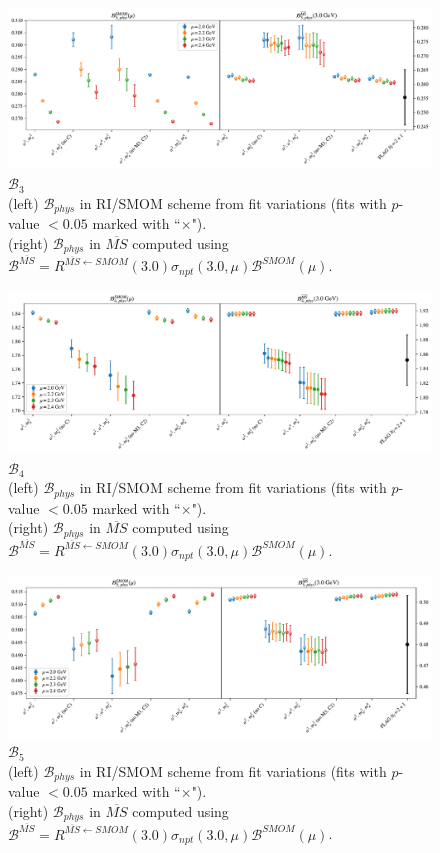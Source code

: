 \documentclass[12pt]{extarticle}
\begin{document}
\begin{figure}
\centering
\includegraphics[page=1, width=1.1\textwidth]{SSmPP/SUSY/fit_summary.pdf}
\caption{$\mathcal{B}_{3}$\\(left) $\mathcal{B}_{phys}$ in RI/SMOM scheme from fit variations (fits with $p$-value $<0.05$ marked with ``$\times$"). \\(right) $\mathcal{B}_{phys}$ in $\overline{MS}$ computed using $\mathcal{B}^{\overline{MS}} = R^{\overline{MS}\leftarrow SMOM}(3.0)\sigma_{npt}(3.0,\mu) \mathcal{B}^{SMOM}(\mu)$.}
\end{figure}
\clearpage
\begin{figure}
\centering
\includegraphics[page=1, width=1.1\textwidth]{SSpPP/SUSY/fit_summary.pdf}
\caption{$\mathcal{B}_{4}$\\(left) $\mathcal{B}_{phys}$ in RI/SMOM scheme from fit variations (fits with $p$-value $<0.05$ marked with ``$\times$"). \\(right) $\mathcal{B}_{phys}$ in $\overline{MS}$ computed using $\mathcal{B}^{\overline{MS}} = R^{\overline{MS}\leftarrow SMOM}(3.0)\sigma_{npt}(3.0,\mu) \mathcal{B}^{SMOM}(\mu)$.}
\end{figure}
\clearpage
\begin{figure}
\centering
\includegraphics[page=1, width=1.1\textwidth]{TT/SUSY/fit_summary.pdf}
\caption{$\mathcal{B}_{5}$\\(left) $\mathcal{B}_{phys}$ in RI/SMOM scheme from fit variations (fits with $p$-value $<0.05$ marked with ``$\times$"). \\(right) $\mathcal{B}_{phys}$ in $\overline{MS}$ computed using $\mathcal{B}^{\overline{MS}} = R^{\overline{MS}\leftarrow SMOM}(3.0)\sigma_{npt}(3.0,\mu) \mathcal{B}^{SMOM}(\mu)$.}
\end{figure}
\clearpage
\end{document}
